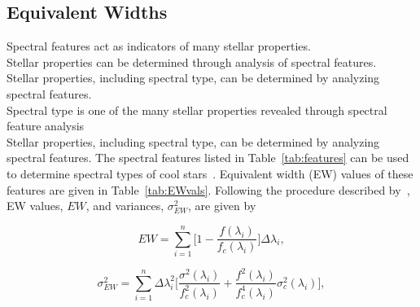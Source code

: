 \subsection{Equivalent Widths}

 Spectral features act as indicators of many stellar properties.  \\
 Stellar properties can be determined through analysis of spectral features.  \\
 Stellar properties, including spectral type, can be determined by analyzing spectral features.\\
 Spectral type is one of the many stellar properties revealed through spectral feature analysis\\


Stellar properties, including spectral type, can be determined by analyzing spectral features.
The spectral features listed in Table~\ref{tab:features} 
can be used to determine spectral types of cool 
stars~\cite{Rayner_2009}.  Equivalent width (EW) 
values of these features are given in Table~\ref{tab:EWvals}.  
Following the procedure described by~\cite{Cushing_2005}, EW values, $EW$, and 
variances, $\sigma_{EW}^{2}$, are given by


\begin{equation}\label{eq:EW}
	EW = \sum_{i=1}^{n} \bigg[1 - \frac{f(\lambda_{i})}{f_{c}(\lambda_{i})} \bigg] \Delta\lambda_{i},
\end{equation}

\begin{equation}\label{eq:EWvar}
	\sigma_{EW}^{2} = \sum_{i=1}^{n} \Delta\lambda_{i}^{2} \bigg[ \frac{\sigma^{2}(\lambda_{i})}{f_{c}^{2}(\lambda_{i})} + \frac{f^{2}(\lambda_{i})}{f_{c}^{4}(\lambda_{i})}\sigma_{c}^{2}(\lambda_{i}) \bigg],
\end{equation}


